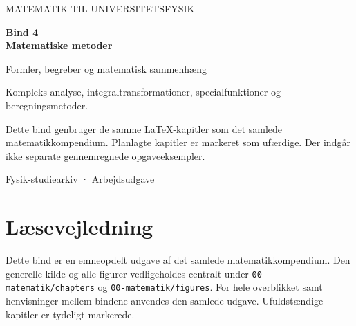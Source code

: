 \documentclass[11pt,a4paper,oneside]{book}
\begin{document}
\frontmatter
\begin{titlepage}
\centering
\vspace*{30mm}
{\sffamily\color{arkivblaa}\Large MATEMATIK TIL UNIVERSITETSFYSIK\par}
\vspace{16mm}
{\Huge\bfseries Bind 4\\[6mm]Matematiske metoder\par}
\vspace{13mm}
{\Large Formler, begreber og matematisk sammenhæng\par}
\vfill
\begin{minipage}{0.8\textwidth}
Kompleks analyse, integraltransformationer, specialfunktioner og beregningsmetoder.

Dette bind genbruger de samme LaTeX-kapitler som det samlede matematikkompendium. Planlagte kapitler er markeret som ufærdige. Der indgår ikke separate gennemregnede opgaveeksempler.
\end{minipage}
\vspace{14mm}
{\small Fysik-studiearkiv · Arbejdsudgave\par}
\end{titlepage}
\chapter*{Læsevejledning}
Dette bind er en emneopdelt udgave af det samlede matematikkompendium. Den generelle kilde og alle figurer vedligeholdes centralt under \texttt{00-matematik/chapters} og \texttt{00-matematik/figures}. For hele overblikket samt henvisninger mellem bindene anvendes den samlede udgave. Ufuldstændige kapitler er tydeligt markerede.
\begingroup\small\tableofcontents\endgroup
\mainmatter




\end{document}
